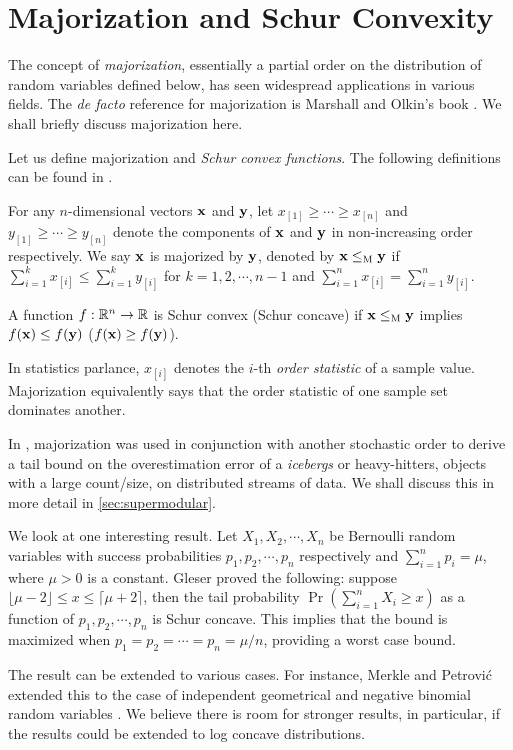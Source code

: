 \section{Majorization and Schur Convexity}

The concept of \textit{majorization}, essentially a partial order on the distribution of random variables defined
below, has seen widespread applications in various fields. The \textit{de facto} reference for majorization is
Marshall and Olkin's book \cite{Marshall79Majorization}. We shall briefly discuss majorization here.

Let us define majorization and \textit{Schur convex functions}.
The following definitions can be found in \cite{Marshall79Majorization}.
\begin{defn}
For any $n$-dimensional vectors $\mathbf{x}$ and $\mathbf{y}$, let $x_{[1]} \ge \cdots \ge x_{[n]}$ and $y_{[1]} \ge \cdots \ge y_{[n]}$
denote the components of $\mathbf{x}$ and $\mathbf{y}$ in non-increasing order respectively. We say $\mathbf{x}$ is majorized by $\mathbf{y}$,
denoted by $\mathbf{x} \le_{\text{M}} \mathbf{y}$ if $\sum_{i=1}^k x_{[i]} \le \sum_{i=1}^k y_{[i]}$ for $k=1,2,\cdots,n-1$ and  
$\sum_{i=1}^n x_{[i]} = \sum_{i=1}^n y_{[i]}$.
\label{def:majorize}
\end{defn}

\begin{defn}
A function $f : \mathbb R^n \to \mathbb R$ is Schur convex (Schur concave) if $\mathbf{x} \le_{\text{M}} \mathbf{y}$ implies $f(\mathbf{x}) \le f(\mathbf{y})$ ($f(\mathbf{x}) \ge f(\mathbf{y})$).
\label{def:schur_convex}
\end{defn}

In statistics parlance, $x_{[i]}$ denotes the $i$-th \textit{order statistic} of a sample value. Majorization equivalently
says that the order statistic of one sample set dominates another. 

In \cite{Zhao10GlobalIceberg}, majorization was used in conjunction with another stochastic order to derive
a tail bound on the overestimation error of a \textit{icebergs} or heavy-hitters, \ie objects with a large count/size,
on distributed streams of data. We shall discuss this in more detail in \autoref{sec:supermodular}.

We look at one interesting result.
Let $X_1,X_2,\cdots, X_n$ be Bernoulli random variables with success probabilities $p_1,p_2,\cdots,p_n$ respectively
and $\sum_{i=1}^n p_i = \mu$, where $\mu >0$ is a constant. Gleser \cite{Gleser75Schur}  proved the following:
suppose $\lfloor \mu - 2 \rfloor \le x \le \lceil \mu+2 \rceil$, then the tail probability $\Pr(\sum_{i=1}^n X_i \ge x)$ as
a function of $p_1,p_2, \cdots, p_n$ is Schur concave. This implies that the bound is maximized when $p_1 =
p_2 = \cdots = p_n = \mu/n$, providing a worst case bound.

The result can be extended to various cases. For instance, Merkle and Petrovi\'c extended this to the case
of independent geometrical and negative binomial random variables \cite{Merkle97Geom}. We believe
there is room for stronger results, in particular, if the results could be extended to log concave distributions. 